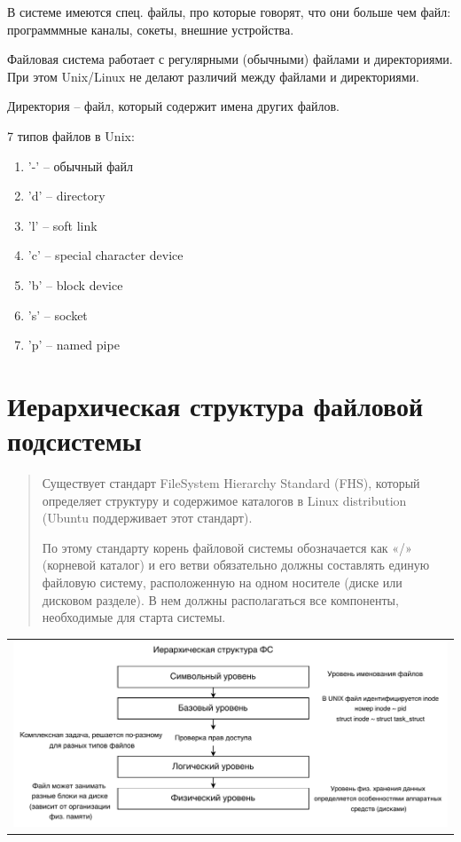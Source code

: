 В системе имеются спец. файлы, про которые говорят, что они больше чем файл: программмные каналы, сокеты, внешние устройства.

Файловая система работает с регулярными (обычными) файлами и директориями. При этом Unix/Linux не делают различий между файлами и директориями.

Директория -- файл, который содержит имена других файлов.

7 типов файлов в Unix:
\begin{enumerate}
    \item '-' -- обычный файл
    \item 'd' -- directory
    \item 'l' -- soft link
    \item 'c' -- special character device
    \item 'b' -- block device
    \item 's' -- socket
    \item 'p' -- named pipe
\end{enumerate}

\section{Иерархическая структура файловой подсистемы}

\begin{quote}
Существует стандарт FileSystem Hierarchy Standard (FHS), который определяет структуру и содержимое каталогов в Linux distribution (Ubuntu поддерживает этот стандарт).

По этому стандарту корень файловой системы обозначается как «/» (корневой каталог) и его ветви обязательно должны составлять единую файловую систему, расположенную на одном носителе (диске или дисковом разделе). В нем должны располагаться все компоненты, необходимые для старта системы.
\end{quote}

\begin{table}[h!]
  \centering
  \begin{tabular}{p{1\linewidth}}
    \centering
    \includegraphics[width=0.8\linewidth]{./images/ierarh_fs.pdf}
  \end{tabular}
\end{table}

